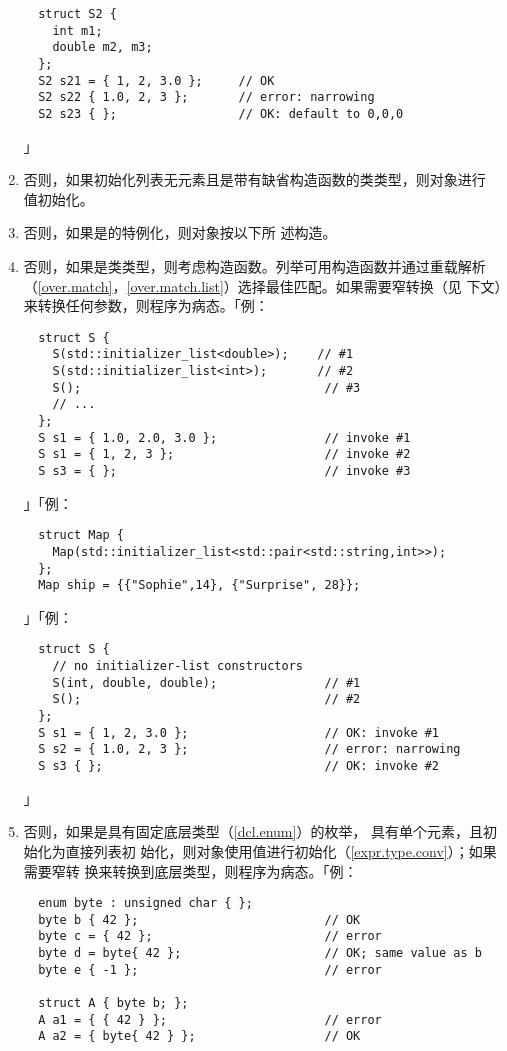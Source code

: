 \begin{enumerate}
{\begin{lstlisting}
  struct S2 {
    int m1;
    double m2, m3;
  };
  S2 s21 = { 1, 2, 3.0 };     // OK
  S2 s22 { 1.0, 2, 3 };       // error: narrowing
  S2 s23 { };                 // OK: default to 0,0,0
\end{lstlisting}」}
  \item{否则，如果初始化列表无元素且是带有缺省构造函数的类类型，则对象进行
    值初始化。}
  \item{否则，如果是的特例化，则对象按以下所
    述构造。}
  \item{否则，如果是类类型，则考虑构造函数。列举可用构造函数并通过重载解析
    （\ref{over.match}，\ref{over.match.list}）选择最佳匹配。如果需要窄转换（见
    下文）来转换任何参数，则程序为病态。「例：
\begin{lstlisting}
  struct S {
    S(std::initializer_list<double>);    // #1
    S(std::initializer_list<int>);       // #2
    S();                                  // #3
    // ...
  };
  S s1 = { 1.0, 2.0, 3.0 };               // invoke #1
  S s1 = { 1, 2, 3 };                     // invoke #2
  S s3 = { };                             // invoke #3
\end{lstlisting}」「例：
\begin{lstlisting}
  struct Map {
    Map(std::initializer_list<std::pair<std::string,int>>);
  };
  Map ship = {{"Sophie",14}, {"Surprise", 28}};
\end{lstlisting}」「例：
\begin{lstlisting}
  struct S {
    // no initializer-list constructors
    S(int, double, double);               // #1
    S();                                  // #2
  };
  S s1 = { 1, 2, 3.0 };                   // OK: invoke #1
  S s2 = { 1.0, 2, 3 };                   // error: narrowing
  S s3 { };                               // OK: invoke #2
\end{lstlisting}」}
  \item{否则，如果是具有固定底层类型（\ref{dcl.enum}）的枚举，
    具有单个元素，且初始化为直接列表初
    始化，则对象使用值进行初始化（\ref{expr.type.conv}）；如果需要窄转
    换来转换到底层类型，则程序为病态。「例：
\begin{lstlisting}
  enum byte : unsigned char { };
  byte b { 42 };                          // OK
  byte c = { 42 };                        // error
  byte d = byte{ 42 };                    // OK; same value as b
  byte e { -1 };                          // error

  struct A { byte b; };
  A a1 = { { 42 } };                      // error
  A a2 = { byte{ 42 } };                  // OK


\end{lstlisting}}
\end{enumerate}
